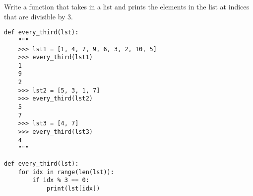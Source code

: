 \begin{blocksection}
\question Write a function that takes in a list and prints the elements in the list at indices that are
divisible by 3.

\begin{lstlisting}
def every_third(lst): 
    """
    >>> lst1 = [1, 4, 7, 9, 6, 3, 2, 10, 5]
    >>> every_third(lst1)
    1
    9
    2
    >>> lst2 = [5, 3, 1, 7]
    >>> every_third(lst2)
    5
    7
    >>> lst3 = [4, 7]
    >>> every_third(lst3)
    4
    """

\end{lstlisting}

\begin{solution}[1.5in]
\begin{lstlisting}
def every_third(lst):
    for idx in range(len(lst)):
        if idx % 3 == 0:
            print(lst[idx])
\end{lstlisting}
\end{solution}
\end{blocksection}
